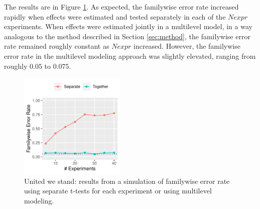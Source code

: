 \documentclass{edm_article}
\begin{document}
The results are in Figure \ref{fig:sim}.
As expected, the familywise error rate increased rapidly when effects
were estimated and tested separately in each of the $Nexpr$
experiments.
When effects were estimated jointly in a multilevel model, in a way
analogous to the method described in Section \ref{sec:method}, the
familywise error rate remained roughly constant as $Nexpr$ increased.
However, the familywise error rate in the multilevel modeling approach
was slightly elevated, ranging from roughly $0.05$ to $0.075$.

\begin{figure}
  \centering
  \includegraphics[width=0.45\textwidth]{../simulationResults}
  \caption{United we stand: results from a simulation of familywise
    error rate using separate t-tests for each experiment or using
    multilevel modeling.}
  \label{fig:sim}
\end{figure}
\end{document}
